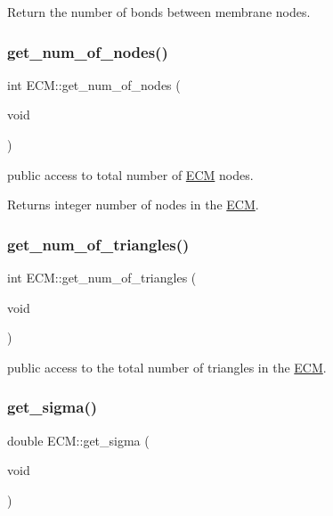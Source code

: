 Return the number of bonds between membrane nodes. \mbox{\label{classECM_a6890f319e54f20f6090dff58b95f4459}} 
\subsubsection{\texorpdfstring{get\_num\_of\_nodes()}{get\_num\_of\_nodes()}}
{\footnotesize\ttfamily int E\+C\+M\+::get\+\_\+num\+\_\+of\+\_\+nodes (\begin{DoxyParamCaption}\item[{void}]{ }\end{DoxyParamCaption})\hspace{0.3cm}{\ttfamily [inline]}}



public access to total number of \mbox{\hyperlink{classECM}{E\+CM}} nodes. 

\begin{DoxyReturn}{Returns}
integer number of nodes in the \mbox{\hyperlink{classECM}{E\+CM}}. 
\end{DoxyReturn}
\mbox{\label{classECM_a7e30f13a497b78851fa165609c20344b}} 
\subsubsection{\texorpdfstring{get\_num\_of\_triangles()}{get\_num\_of\_triangles()}}
{\footnotesize\ttfamily int E\+C\+M\+::get\+\_\+num\+\_\+of\+\_\+triangles (\begin{DoxyParamCaption}\item[{void}]{ }\end{DoxyParamCaption})\hspace{0.3cm}{\ttfamily [inline]}}

public access to the total number of triangles in the \mbox{\hyperlink{classECM}{E\+CM}}. \mbox{\label{classECM_ab955084115d90d0410add1906b4efe85}} 
\subsubsection{\texorpdfstring{get\_sigma()}{get\_sigma()}}
{\footnotesize\ttfamily double E\+C\+M\+::get\+\_\+sigma (\begin{DoxyParamCaption}\item[{void}]{ }\end{DoxyParamCaption})\hspace{0.3cm}{\ttfamily [inline]}}

